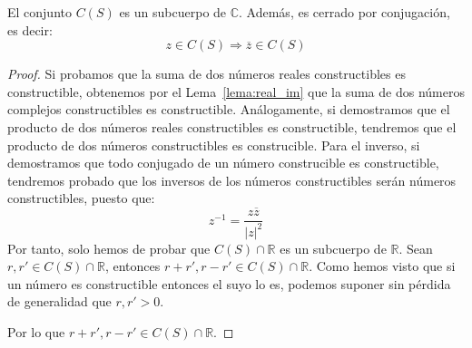\begin{prop}
    El conjunto $C(S)$ es un subcuerpo de $\mathbb{C}$. Además, es cerrado por conjugación, es decir:
    \begin{equation*}
        z\in C(S) \Longrightarrow \overline{z}\in C(S)
    \end{equation*}
    \begin{proof}
        Si probamos que la suma de dos números reales constructibles es constructible, obtenemos por el Lema~\ref{lema:real_im} que la suma de dos números complejos constructibles es constructible. Análogamente, si demostramos que el producto de dos números reales constructibles es constructible, tendremos que el producto de dos números constructibles es construcible. Para el inverso, si demostramos que todo conjugado de un número construcible es constructible, tendremos probado que los inversos de los números constructibles serán números constructibles, puesto que:
        \begin{equation*}
            z^{-1} = \dfrac{z\overline{z}}{{|z|}^{2}}
        \end{equation*}
        Por tanto, solo hemos de probar que $C(S)\cap \mathbb{R}$ es un subcuerpo de $\mathbb{R}$. Sean $r,r'\in C(S)\cap \mathbb{R}$, entonces $r+r', r-r'\in C(S)\cap \mathbb{R}$. Como hemos visto que si un número es constructible entonces el suyo lo es, podemos suponer sin pérdida de generalidad que $r,r'>0$. 
        \begin{figure}[H]
            \centering
        \end{figure}
        Por lo que $r+r',r-r'\in C(S)\cap \mathbb{R}$.


\end{proof}
\end{prop}
